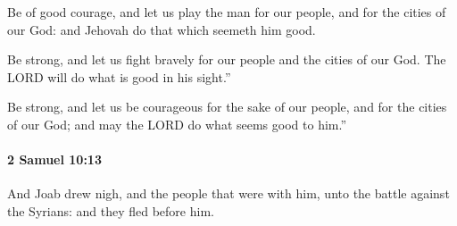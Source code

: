 			\begin{versebox}
					\item[BHS] 
					\item[ASV] Be of good courage, and let us play the man for our people, and for the cities of our God: and Jehovah do that which seemeth him good.
					\item[NIV] Be strong, and let us fight bravely for our people and the cities of our God. The LORD will do what is good in his sight.”
					\item[NRSV] Be strong, and let us be courageous for the sake of our people, and for the cities of our God; and may the LORD do what seems good to him.”
			\end{versebox}

		\paragraph{2 Samuel 10:13} %
			\label{2SAMUEL-10-13}

			And Joab drew nigh, and the people that were with him, unto the battle against the Syrians: and they fled before him.

